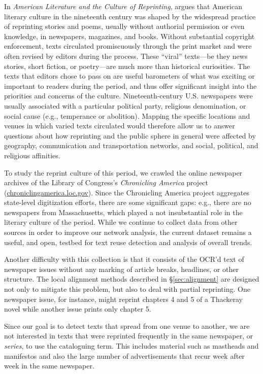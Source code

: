\documentclass[pdftex,11pt]{article}
\begin{document}
In \emph{American Literature and the Culture of Reprinting},
\citet{mcgill03:_americ_liter_cultur_reprin} argues that American
literary culture in the nineteenth century was shaped by the
widespread practice of reprinting stories and poems, usually without
authorial permission or even knowledge, in newspapers, magazines, and
books.  Without substantial copyright enforcement, texts circulated
promiscuously through the print market and were often revised by
editors during the process.  These ``viral'' texts---be they news
stories, short fiction, or poetry---are much more than historical
curiosities.  The texts that editors chose to pass on are useful
barometers of what was exciting or important to readers during the
period, and thus offer significant insight into the priorities and
concerns of the culture.  Nineteenth-century U.S. newspapers were
usually associated with a particular political party, religious
denomination, or social cause (e.g., temperance or abolition).
Mapping the specific locations and venues in which varied texts
circulated would therefore allow us to answer questions about how
reprinting and the public sphere in general were affected by
geography, communication and transportation networks, and social,
political, and religious affinities.

To study the reprint culture of this period, we crawled the online
newspaper archives of the Library of Congress's \emph{Chronicling
  America} project (\url{chroniclingamerica.loc.gov}).  Since the
Chronicling America project aggregates state-level digitization
efforts, there are some significant gaps: e.g., there are no
newspapers from Massachusetts, which played a not insubstantial role
in the literary culture of the period.  While we continue to collect
data from other sources in order to improve our network analysis, the
current dataset remains a useful, and open, testbed for text reuse
detection and analysis of overall trends.

Another difficulty with this collection is that it consists of the
OCR'd text of newspaper issues without any marking of article breaks,
headlines, or other structure.  The local alignment methods described
in \S\ref{sec:alignment} are designed not only to mitigate this
problem, but also to deal with partial reprinting.  One newspaper
issue, for instance, might reprint chapters 4 and 5 of a Thackeray
novel while another issue prints only chapter 5.

Since our goal is to detect texts that spread from one venue to
another, we are not interested in texts that were reprinted frequently
in the same newspaper, or \textit{series}, to use the cataloguing
term.  This includes material such as mastheads and manifestos and
also the large number of advertisements that recur week after week in
the same newspaper.
\end{document}

